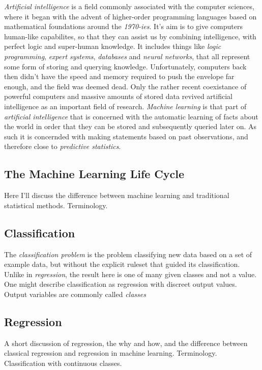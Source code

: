 \documentclass[a4paper,man,12pt,apacite]{apa6} %
\begin{document}
\emph{Artificial intelligence} is a field commonly associated with the
computer sciences, where it began with the advent of higher-order
programming languages based on mathematical foundations around the \emph{1970-ies}.
It's aim is to give computers human-like capabilites, so that they can assist
us by combining intelligence, with perfect logic and super-human knowledge.
It includes things like \emph{logic programming}, \emph{expert systems},
\emph{databases} and \emph{neural networks}, that all represent some form of
storing and querying knowledge.
Unfortunately, computers back then didn't have the speed and memory required
to push the envelope far enough, and the field was deemed dead.
Only the rather recent coexistance of powerful computers and massive amounts
of stored data revived artificial intelligence as an important field of
research.
\emph{Machine learning} is that part of \emph{artificial intelligence} that
is concerned with the automatic learning of facts about the world in order
that they can be stored and subsequently queried later on.
As such it is concernded with making statements based on past observations,
and therefore close to \emph{predictive statistics}. 

\subsection{The Machine Learning Life Cycle}
Here I'll discuss the difference between machine learning and traditional
statistical methods. Terminology.

\subsection{Classification}
The \emph{classification problem} is the problem classifying new data based
on a set of example data, but without the explicit ruleset that guided its
classification.
Unlike in \emph{regression}, the result here is one of many given classes
and not a value.
One might describe classification as regression with discreet output values.
Output variables are commonly called \emph{classes}

\subsection{Regression}
A short discussion of regression, the why and how, and the difference
between classical regression and regression in machine learning.
Terminology. Classification with continuous classes.
\end{document}
